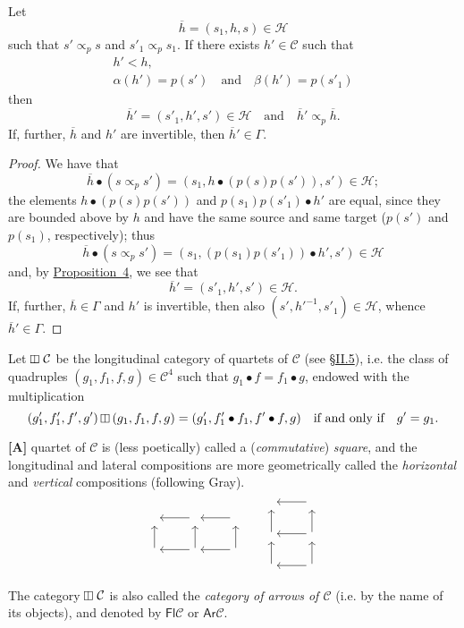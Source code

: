 \documentclass[a4paper,fleqn]{article}
\theoremstyle{plain}
\newenvironment{proposition}[1]
  {\renewcommand\theinnerproposition{#1}\innerproposition}
  {\endinnerproposition}
\theoremstyle{definition}
\newenvironment{longcomm}[1]
  {\noindent\textbf{[#1]}\rmfamily}
  {}
\newcommand{\oldpage}[1]{{\marginpar{\footnotesize$\bigg\vert$\,\,\,\,\textit{p.~#1}}}}
\newcommand{\textand}{\quad\text{and}\quad}
\newcommand{\CC}{\mathcal{C}}
\newcommand{\HH}{\mathcal{H}}
\newcommand{\subs}{\mathrel{\propto}}
\newcommand{\vsqbox}{{\rotatebox{90}{$\boxminus$}}}
\DeclareMathOperator{\vsq}{\raisebox{-.1em}{$\vsqbox$\,}}
\newcommand{\vmult}{\mathbin{\raisebox{-.1em}{$\vsqbox$}}}
\begin{document}
\begin{proposition}{7}
\label{proposition:i-7}
  Let
  \[
    \overline{h}
    = (s_1,h,s)
    \in\HH
  \]
  such that $s'\subs_p s$ and $s'_1\subs_p s_1$.
  If there exists $h'\in\CC$ such that
  \[
    \begin{gathered}
      h'<h,
    \\\alpha(h')=p(s')
      \textand
      \beta(h')=p(s'_1)
    \end{gathered}
  \]
  then
  \[
    \overline{h}'
    =(s'_1,h',s')
    \in\HH
    \textand
    \overline{h}'\subs_p\overline{h}.
  \]
  If, further, $\overline{h}$ and $h'$ are invertible, then $\overline{h}'\in\Gamma$.
\end{proposition}

\begin{proof}
  We have that
  \[
    \overline{h}\bullet(s\subs_p s')
    = (s_1,h\bullet(p(s)p(s')),s')
    \in\HH;
  \]
  the elements $h\bullet(p(s)p(s'))$ and $p(s_1)p(s'_1)\bullet h'$ are equal, since they are bounded above by $h$ and have the same source and same target ($p(s')$ and $p(s_1)$, respectively);
  thus
  \[
    \overline{h}\bullet(s\subs_p s')
    = (s_1,(p(s_1)p(s'_1))\bullet h',s')
    \in\HH
  \]
  and, by \hyperref[proposition:i-4]{Proposition~4}, we see that
  \[
    \overline{h}'
    = (s'_1,h',s')
    \in\HH.
  \]
  \oldpage{365}
  If, further, $\overline{h}\in\Gamma$ and $h'$ is invertible, then also $(s',h'^{-1},s'_1)\in\HH$, whence $\overline{h}'\in\Gamma$.
\end{proof}

Let $\vsq\CC$ be the longitudinal category of quartets of $\CC$ (see \hyperref[section:ii.5]{§II.5}), i.e. the class of quadruples $(g_1,f_1,f,g)\in\CC^4$ such that $g_1\bullet f=f_1\bullet g$, endowed with the multiplication
\[
  (g'_1,f'_1,f',g')\vmult(g_1,f_1,f,g)
  = (g'_1,f'_1\bullet f_1,f'\bullet f,g)
  \quad\text{if and only if}\quad
  g'=g_1.
\]

\begin{longcomm}{37.1}
  A quartet of $\CC$ is (less poetically) called a (\emph{commutative}) \emph{square}, and the longitudinal and lateral compositions are more geometrically called the \emph{horizontal} and \emph{vertical} compositions (following Gray).
  \[
    \begin{tikzcd}
      {}
      &{} \ar[l]
      &{} \ar[l]
    \\{} \ar[u]
      &{} \ar[l] \ar[u]
      &{} \ar[l] \ar[u]
    \end{tikzcd}
    \qquad
    \begin{tikzcd}
      {}
      & \ar[l]
    \\{} \ar[u]
      & \ar[l] \ar[u]
    \\{} \ar[u]
      & \ar[l] \ar[u]
    \end{tikzcd}
  \]

  The category $\vsq\CC$ is also called the \emph{category of arrows of $\CC$} (i.e. by the name of its objects), and denoted by $\mathsf{Fl}\CC$ or $\mathsf{Ar}\CC$.
\end{longcomm}
\end{document}
